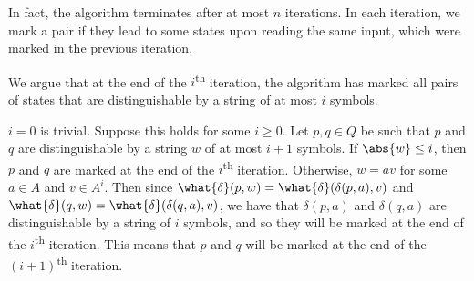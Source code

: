 In fact, the algorithm terminates after at most $n$ iterations.
In each iteration, we mark a pair if they lead to some states upon reading
the same input, which were marked in the previous iteration.

We argue that at the end of the $i$\textsuperscript{th} iteration,
the algorithm has marked all pairs of states that are distinguishable
by a string of at most $i$ symbols.

$i = 0$ is trivial.
Suppose this holds for some $i \ge 0$.
Let $p, q \in Q$ be such that $p$ and $q$ are distinguishable by a string
$w$ of at most $i + 1$ symbols.
If $\abs{w} \le i$, then $p$ and $q$ are marked at the end of the
$i$\textsuperscript{th} iteration.
Otherwise, $w = av$ for some $a \in A$ and $v \in A^i$.
Then since $\what{\delta}(p, w) = \what{\delta}(\delta(p, a), v)$ and
$\what{\delta}(q, w) = \what{\delta}(\delta(q, a), v)$, we have that
$\delta(p, a)$ and $\delta(q, a)$ are distinguishable by a string of $i$
symbols, and so they will be marked at the end of the
$i$\textsuperscript{th} iteration.
This means that $p$ and $q$ will be marked at the end of the
$(i + 1)$\textsuperscript{th} iteration.
